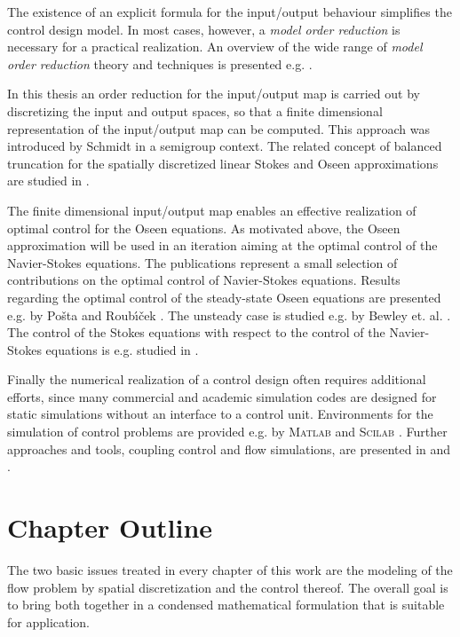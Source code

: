 \documentclass[a4paper,10pt,BCOR=15mm]{scrbook}
\begin{document}
The existence of an explicit formula for the input/output behaviour simplifies the control design model. In most cases, however, a \textit{model order reduction} is necessary for a practical realization. An overview of the wide range of \textit{model order reduction} theory and techniques is presented e.g. \cite{antou,bemeso}. 

In this thesis an order reduction for the input/output map is carried out by discretizing the input and output spaces, so that a finite dimensional representation of the input/output map can be computed. This approach was introduced by Schmidt \cite{schm} in a semigroup context. The related concept of balanced truncation for the spatially discretized linear Stokes and Oseen approximations are studied in \cite{hesosu,stykel}.

The finite dimensional input/output map enables an effective realization of optimal control for the Oseen equations. As motivated above, the Oseen approximation will be used in an iteration aiming at the optimal control of the Navier-Stokes equations. The publications \cite{betezi,dehi,gunzo,guhosv,guma,guma2,hesosu,hiku,hinz,hosv} represent a small selection of contributions on the optimal control of Navier-Stokes equations. 
Results regarding the optimal control of the steady-state Oseen equations are presented e.g. by Po{\v s}ta and Roub{\'\i}{\v c}ek \cite{poro}. The unsteady case is studied e.g. by Bewley et. al. \cite{betezi}. The control of the Stokes equations with respect to the control of the Navier-Stokes equations is e.g. studied in \cite{constonse}.

Finally the numerical realization of a control design often requires additional efforts, since many commercial and academic simulation codes are designed for static simulations without an interface to a control unit. Environments for the simulation of control problems are provided e.g. by \textsc{Matlab} and \textsc{Scilab} \cite{scilab,matconbo}. Further approaches and tools, coupling control and flow simulations, are presented in \cite[Ch. 5]{schm} and \cite{slawig}.

\section{Chapter Outline}

The two basic issues treated in every chapter of this work are the modeling of the flow problem by spatial discretization and the control thereof. The overall goal is to bring both together in a condensed mathematical formulation that is suitable for application.
\end{document}
